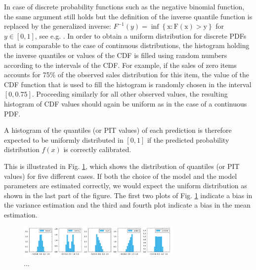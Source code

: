 \documentclass[BCOR=1mm, DIV=calc,10pt,
twoside=true,
twocolumn,
headings=normal]{scrartcl}
\newcommand{\fig}{Fig. }
\begin{document}
In case of discrete probability functions such as the negative binomial function, the same argument still holds but the definition of the inverse quantile function is replaced by the generalized inverse: $F^{-1}(y) = \mathrm{\inf \left \{x : F(x)>y\right  \} }$ for $y \in [0,1]$, see e.g. \cite[p. 54]{casella2002statistical}. In order to obtain a uniform distribution for discrete PDFs that is comparable to the case of continuous distributions, the histogram holding the inverse quantiles or values of the CDF is filled using random numbers according to the intervals of the CDF. For example, if the sales of zero items accounts for 75\% of the observed sales distribution for this item, the value of the CDF function that is used to fill the histogram is randomly chosen in the interval $[0,0.75]$. Proceeding similarly for all other observed values, the resulting histogram of CDF values should again be uniform as in the case of a continuous PDF.

A histogram of the quantiles (or PIT values) of each prediction is therefore expected to be uniformly distributed in $[0,1]$ if the predicted probability distribution $f(x)$ is correctly calibrated.

This is illustrated in \fig \ref{fig:cdf_histos}, which shows the distribution of quantiles (or PIT values) for five different cases. If both the choice of the model and the model parameters are estimated correctly, we would expect the uniform distribution as shown in the last part of the figure. The first two plots of \fig \ref{fig:cdf_histos} indicate a bias in the variance estimation and the third and fourth plot indicate a bias in the mean
estimation.

\begin{figure}
\begin{center}
\includegraphics[width=8cm]{../figures/cdf_histos}
\caption{\label{fig:cdf_histos} ...}
\end{center}
\end{figure}
\end{document}
